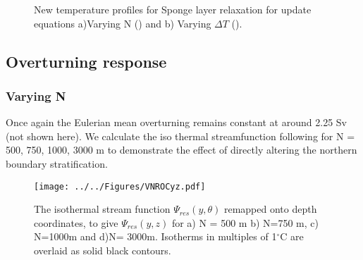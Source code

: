 \begin{figure}[H]
\center
{}
\qquad 
{}
\caption{New temperature profiles for Sponge layer relaxation for update equations a)Varying N () and b) Varying $\Delta T$ ().}
\label{fig:Tstratn}
\end{figure}

\subsection{Overturning response}

\subsubsection*{Varying N}

Once again the Eulerian mean overturning remains constant at around 2.25 Sv (not shown here). We calculate the iso thermal streamfunction following  for N = 500, 750, 1000, 3000 m to demonstrate the effect of directly altering the northern boundary stratification.
\begin{figure}[H]
\noindent \texttt{[image: ../../Figures/VNROCyz.pdf]}
\caption{The isothermal stream function $\Psi_{res}(y,\theta)$ remapped onto depth coordinates, to give $\Psi_{res}(y,z)$ for a) N = 500 m  b) N=750 m, c) N=1000m and d)N= 3000m. Isotherms in multiples of 1$^{\circ}$C are overlaid as solid black contours.}
\label{fig:Remap_varyN}
\end{figure}


